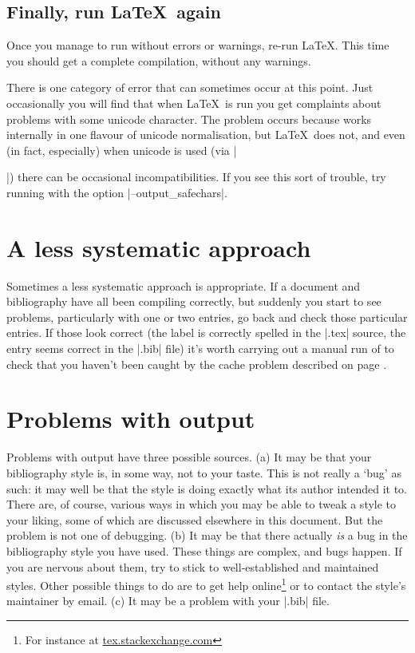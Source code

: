 \subsection{Finally, run \LaTeX\ again}

Once you manage to run  without errors or warnings,
re-run \LaTeX. This time you should get a complete compilation,
without any warnings.

There is one category of error that can sometimes occur at this
point. Just occasionally you will find that when \LaTeX\ is run you
get complaints about problems with some unicode character. The problem
occurs because  works internally in one flavour of
unicode normalisation, but \LaTeX\ does not, and even (in fact,
especially) when unicode is used (via |\usepackage[utf8]{inputenc}|)
there can be occasional incompatibilities. If you see this sort of
trouble, try running  with the option
|--output_safechars|.

\section{A less systematic approach}

Sometimes a less systematic approach is appropriate. If a document and
bibliography have all been compiling correctly, but suddenly you start
to see problems, particularly with one or two entries, go back and
check those particular entries. If those look correct (the label is
correctly spelled in the |.tex| source, the entry seems correct in the
|.bib| file) it's worth carrying out a manual run of 
to check that you haven't been caught by the cache problem described
on page \pageref{cache}.

\section{Problems with output}

Problems with output have three possible sources. (a) It may be that
your bibliography style is, in some way, not to your taste. This is
not really a `bug' as such: it may well be that the style is doing
exactly what its author intended it to. There are, of course, various
ways in which you may be able to tweak a style to your liking, some of
which are discussed elsewhere in this document. But the problem is not
one of debugging. (b) It may be that there actually \emph{is} a bug in
the bibliography style you have used. These things are complex, and
bugs happen. If you are nervous about them, try to stick to
well-established and maintained styles. Other possible things to do
are to get help online\footnote{For instance at
  \url{tex.stackexchange.com}} or to contact the style's maintainer by
email. (c) It may be a problem with your |.bib| file.

